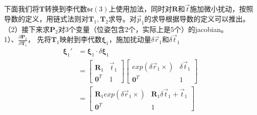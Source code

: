 \documentclass{article}
\begin{document}
下面我们将$\boldsymbol{T}$转换到李代数$\mathfrak{se}(3)$上使用加法，同时对$\boldsymbol{R}$和$\vec{t}$施加微小扰动，按照导数的定义，用链式法则对$\boldsymbol{T}_1,\boldsymbol{T}_2$求导。对$\vec{p}_1$的求导根据导数的定义可以推出。\\
（2）接下来求$\boldsymbol{P}_2$对3个变量（位姿包含2个，实际上是5个）的jacobian。 \\
1）、$\frac{\partial{\boldsymbol{P}_2}}{\partial{\boldsymbol{T}_1}}$， 先将$\boldsymbol{T}_1$映射到李代数$\boldsymbol{\xi}_1$，施加扰动量$\delta \vec{r}_1$和$\delta\vec{t}_1$
\begin{equation}
	\begin{aligned}
		\boldsymbol{\xi}_1'                         & =\boldsymbol{\xi}_1 \cdot \delta \boldsymbol{\xi}_1 \\&=
		\left[
		\begin{matrix}  
		\boldsymbol{R}_1                            & \vec{t}_1                                           \\  
		\boldsymbol{0}^T                            & 1                                                   
		\end{matrix}
		\right]
		\left[ 
		\begin{matrix} 
		exp(\delta \vec{r}_1\times)                 & \delta\vec{t}_1                                     \\
		\boldsymbol{0}^T                            & 1                                                   
		\end{matrix}
		\right]\\&=
		\left[ 
		\begin{matrix} 
		\boldsymbol{R}_1exp(\delta \vec{r}_1\times) & \boldsymbol{R}_1\delta \vec{t}_1+\vec{t}_1          \\ 
		\boldsymbol{0}^T                            & 1                                                   
		\end{matrix}
		\right]
	\end{aligned}
\end{equation}
\end{document}
